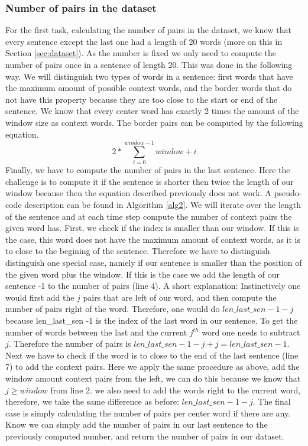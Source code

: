 \subsubsection{Number of pairs in the dataset}
For the first task, calculating the number of pairs in the dataset, we knew that every sentence except the last one had a length of 20 words (more on this in Section \ref{sec:dataset}). As the number is fixed we only need to compute the number of pairs once in a sentence of length 20. This was done in the following way. We will distinguish two types of words in a sentence: first words that have the maximum amount of possible context words, and the border words that do not have this property because they are too close to the start or end of the sentence.
We know that every center word has exactly 2 times the amount of the window size as context words. The border pairs can be computed by the following equation. 
\begin{equation}
2 * \sum_{i=0}^{window -1} window + i
\end{equation}
Finally, we have to compute the number of pairs in the last sentence. Here the challenge is to compute it if the sentence is shorter then twice the length of our window because then the equation described previously does not work. A pseudo-code description can be found in Algorithm \ref{alg2}. We will iterate over the length of the sentence and at each time step compute the number of context pairs the given word has. First, we check if the index is smaller than our window. If this is the case, this word does not have the maximum amount of context words, as it is to close to the begining of the sentence. Therefore we have to distinguish distinguish one special case, namely if our sentence is smaller than the position of the given word plus the window. If this is the case we add the length of our sentence -1 to the number of pairs (line 4). A short explanation: Instinctively one would first add the $j$ pairs that are left of our word, and then compute the number of pairs right of the word. Therefore, one would do $len\_last\_sen -1 -j$ because len\_last\_sen -1  is the index of the last word in our sentence. To get the number of words between the last and the current $j^{th}$ word one needs to subtract $j$. Therefore the number of pairs is $len\_last\_sen -1 -j + j = len\_last\_sen -1$.\\ Next we have to check if the word is to close to the end of the last sentence (line 7) to add the context pairs. Here we apply the same procedure as above, add the window amount context pairs from the left, we can do this because we know that $j \geq window$ from line 2. we also need to add the words right to the current word, therefore, we take the same difference as before: $len\_last\_sen -1 -j$.
The final case is simply calculating the number of pairs per center word if there are any. \\
Know we can simply add the number of pairs in our last sentence to the previously computed number, and return the number of pairs in our dataset.

